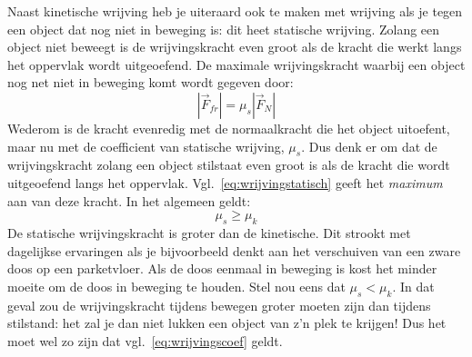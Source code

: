 Naast kinetische wrijving heb je uiteraard ook te maken met wrijving als je tegen een
object dat nog niet in beweging is: dit heet statische wrijving. Zolang een object niet
beweegt is de wrijvingskracht even groot als de kracht die werkt langs het oppervlak wordt
uitgeoefend. De maximale wrijvingskracht waarbij een object nog net niet in beweging komt
wordt gegeven door:
\begin{equation}\label{eq:wrijvingstatisch}
|\vec{F}_{fr}| = \mu_s |\vec{F}_N|
\end{equation}
Wederom is de kracht evenredig met de normaalkracht die het object uitoefent, maar
nu met de coefficient van statische wrijving, $\mu_s$. Dus denk 
er om dat de wrijvingskracht zolang een object stilstaat even groot is als de kracht die
wordt uitgeoefend langs het oppervlak. Vgl.~\ref{eq:wrijvingstatisch} geeft het \emph{maximum}
aan van deze kracht. In het algemeen geldt:
\begin{equation}\label{eq:wrijvingscoef}
\mu_s \geq \mu_k
\end{equation}
De statische wrijvingskracht is groter dan de kinetische. Dit strookt met dagelijkse ervaringen
als je bijvoorbeeld denkt aan het verschuiven van een zware doos op een parketvloer. Als
de doos eenmaal in beweging is kost het minder moeite om de doos in beweging te houden. 
Stel nou eens dat $\mu_s<\mu_k$. In dat geval zou de wrijvingskracht tijdens bewegen 
groter moeten zijn dan tijdens stilstand: het zal je dan niet lukken een object van z'n plek
te krijgen! Dus het moet wel zo zijn dat vgl.~\ref{eq:wrijvingscoef} geldt.

